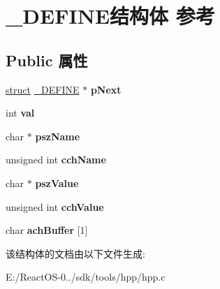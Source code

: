 \hypertarget{struct___d_e_f_i_n_e}{}\section{\+\_\+\+D\+E\+F\+I\+N\+E结构体 参考}
\label{struct___d_e_f_i_n_e}
\subsection*{Public 属性}
\begin{DoxyCompactItemize}
\item 
\mbox{\label{struct___d_e_f_i_n_e_a7456e0a2f964fd79f672baa05dca1d71}} 
\hyperlink{interfacestruct}{struct} \hyperlink{struct___d_e_f_i_n_e}{\+\_\+\+D\+E\+F\+I\+NE} $\ast$ {\bfseries p\+Next}
\item 
\mbox{\label{struct___d_e_f_i_n_e_a8aaf019af8fd484998c9e12cbed0a519}} 
int {\bfseries val}
\item 
\mbox{\label{struct___d_e_f_i_n_e_a94a55035f1bbb6d93a709c8ee6c90a86}} 
char $\ast$ {\bfseries psz\+Name}
\item 
\mbox{\label{struct___d_e_f_i_n_e_a7e7a24b283cabd64115f0eb051a1a1d5}} 
unsigned int {\bfseries cch\+Name}
\item 
\mbox{\label{struct___d_e_f_i_n_e_a7a40449d4de6f55295a93077ada3ec69}} 
char $\ast$ {\bfseries psz\+Value}
\item 
\mbox{\label{struct___d_e_f_i_n_e_a8b994062d16a03a2daef8e2874876fd5}} 
unsigned int {\bfseries cch\+Value}
\item 
\mbox{\label{struct___d_e_f_i_n_e_a5a9796acf1b020c0812a371fde5fe6fe}} 
char {\bfseries ach\+Buffer} \mbox{[}1\mbox{]}
\end{DoxyCompactItemize}


该结构体的文档由以下文件生成\+:\begin{DoxyCompactItemize}
\item 
E\+:/\+React\+O\+S-\/0../sdk/tools/hpp/hpp.\+c\end{DoxyCompactItemize}
